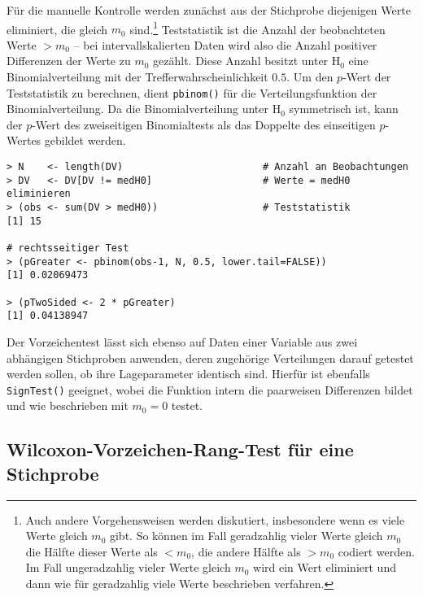 Für die manuelle Kontrolle werden zunächst aus der Stichprobe diejenigen Werte eliminiert, die gleich $m_{0}$ sind.\footnote{Auch andere Vorgehensweisen werden diskutiert, insbesondere wenn es viele Werte gleich $m_{0}$ gibt. So können im Fall geradzahlig vieler Werte gleich $m_{0}$ die Hälfte dieser Werte als $< m_{0}$, die andere Hälfte als $> m_{0}$ codiert werden. Im Fall ungeradzahlig vieler Werte gleich $m_{0}$ wird ein Wert eliminiert und dann wie für geradzahlig viele Werte beschrieben verfahren.} Teststatistik ist die Anzahl der beobachteten Werte $> m_{0}$ -- bei intervallskalierten Daten wird also die Anzahl positiver Differenzen der Werte zu $m_{0}$ gezählt. Diese Anzahl besitzt unter $\text{H}_{0}$ eine Binomialverteilung mit der Trefferwahrscheinlichkeit $0.5$. Um den $p$-Wert der Teststatistik zu berechnen, dient \lstinline!pbinom()! für die Verteilungsfunktion der Binomialverteilung. Da die Binomialverteilung unter $\text{H}_{0}$ symmetrisch ist, kann der $p$-Wert des zweiseitigen Binomialtests als das Doppelte des einseitigen $p$-Wertes gebildet werden.
\begin{lstlisting}
> N    <- length(DV)                        # Anzahl an Beobachtungen
> DV   <- DV[DV != medH0]                   # Werte = medH0 eliminieren
> (obs <- sum(DV > medH0))                  # Teststatistik
[1] 15

# rechtsseitiger Test
> (pGreater <- pbinom(obs-1, N, 0.5, lower.tail=FALSE))
[1] 0.02069473

> (pTwoSided <- 2 * pGreater)
[1] 0.04138947
\end{lstlisting}

Der Vorzeichentest lässt sich ebenso auf Daten einer Variable aus zwei abhängigen Stichproben anwenden, deren zugehörige Verteilungen darauf getestet werden sollen, ob ihre Lageparameter identisch sind. Hierfür ist ebenfalls \lstinline!SignTest()! geeignet, wobei die Funktion intern die paarweisen Differenzen bildet und wie beschrieben mit $m_{0}=0$ testet.

\subsection{Wilcoxon-Vorzeichen-Rang-Test für eine Stichprobe}
\label{sec:wilcoxSignRank}

